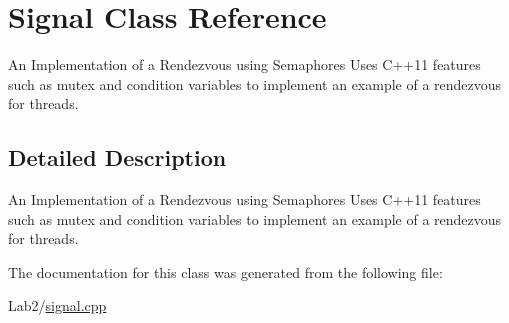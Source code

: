 \hypertarget{class_signal}{}\section{Signal Class Reference}
\label{class_signal}


An Implementation of a Rendezvous using Semaphores Uses C++11 features such as mutex and condition variables to implement an example of a rendezvous for threads.  




\subsection{Detailed Description}
An Implementation of a Rendezvous using Semaphores Uses C++11 features such as mutex and condition variables to implement an example of a rendezvous for threads. 

The documentation for this class was generated from the following file\+:\begin{DoxyCompactItemize}
\item 
Lab2/\hyperlink{signal_8cpp}{signal.\+cpp}\end{DoxyCompactItemize}

